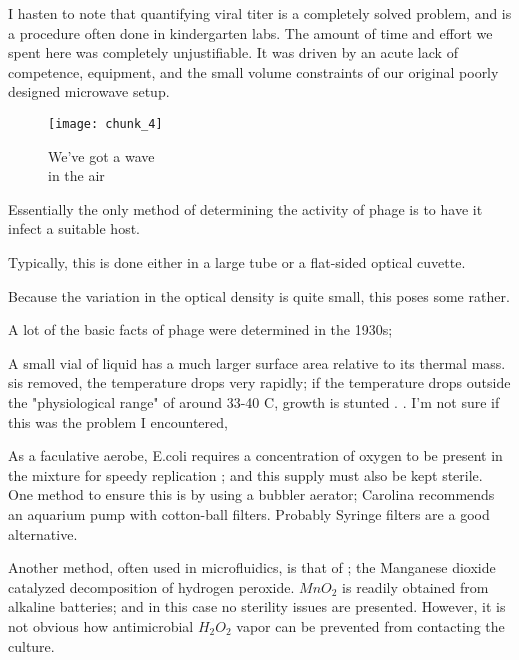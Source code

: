 \documentclass[paper.tex]{subfiles}
\begin{document}
\begin{autem}
	I hasten to note that quantifying viral titer is a completely solved problem, and is a procedure often done in kindergarten labs. The amount of time and effort we spent here was completely unjustifiable. It was driven by an acute lack of competence, equipment, and the small volume constraints of our original poorly designed microwave setup.
\end{autem}


\begin{figure}[H]
	\captionsetup{singlelinecheck = false, justification=justified}
	\centering
	\texttt{[image: chunk\_4]}
	\caption{
		We've got a wave\\
		in the air}
\end{figure}



Essentially the only method of determining the activity of phage is to have it infect a suitable host.

Typically, this is done either in a large tube or a flat-sided optical cuvette.

Because the variation in the optical density is quite small, this poses some rather. 

A lot of the basic facts of phage were determined in the 1930s; 

A small vial of liquid has a much larger surface area relative to its thermal mass. sis removed, the temperature drops very rapidly; if the temperature drops outside the "physiological range" of around 33-40 C, growth is stunted \cite{effect2003}. \cite{growth1946}. I'm not sure if this was the problem I encountered, 

As a faculative aerobe, E.coli requires a concentration of oxygen to be present in the mixture for speedy replication \cite{Effect1965}; and this supply must also be kept sterile. One method to ensure this is by using a bubbler aerator; Carolina recommends an aquarium pump with cotton-ball filters. Probably Syringe filters are a good alternative.

Another method, often used in microfluidics\cite{Microfluidic}, is that of \cite{method1951}; the Manganese dioxide catalyzed decomposition of hydrogen peroxide. $MnO_2$ is readily obtained from alkaline batteries; and in this case no sterility issues are presented. However, it is not obvious how antimicrobial $H_2O_2$ vapor can be prevented from contacting the culture.
\end{document}
